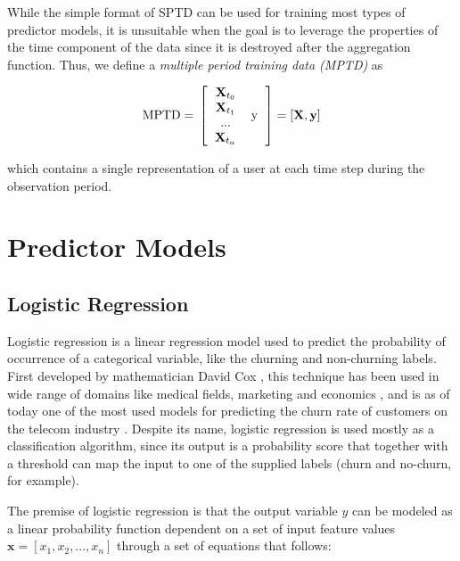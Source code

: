 \documentclass{kththesis}
\begin{document}
While the simple format of SPTD can be used for training most types of predictor models, it is unsuitable when the goal is to leverage the properties of the time component of the data since it is destroyed after the aggregation function. Thus, we define a \emph{multiple period training data (MPTD)} as

\begin{equation}
\text{MPTD} = \\
\left [  
  \begin{tabular}{c c}
   $\mathbf{X}_{t_0}$   & \multirow{4}{*}{y} \\
   $\mathbf{X}_{t_1}$ \\
   ... \\
  $\mathbf{X}_{t_\alpha}$ \\
  \end{tabular}
\right ]
= [\mathbf{X}, \mathbf{y}]
\end{equation}

which contains a single representation of a user at each time step during the observation period.

\section{Predictor Models}

\subsection{Logistic Regression}

Logistic regression is a linear regression model used to predict the probability of occurrence of a categorical variable, like the churning and non-churning labels. First developed by mathematician David Cox \citep{cox1958regression}, this technique has been used in wide range of domains like medical fields, marketing and economics , and is as of today one of the most used models for predicting the churn rate of customers on the telecom industry \citep{mahajan2015review}. Despite its name, logistic regression is used mostly as a classification algorithm, since its output is a probability score that together with a threshold can map the input to one of the supplied labels (churn and no-churn, for example).

The premise of logistic regression is that the output variable $y$ can be modeled as a linear probability function dependent on a set of input feature values  $\mathbf{x} = [x_1, x_2, ..., x_n]$ through a set of equations that follows:
\end{document}
